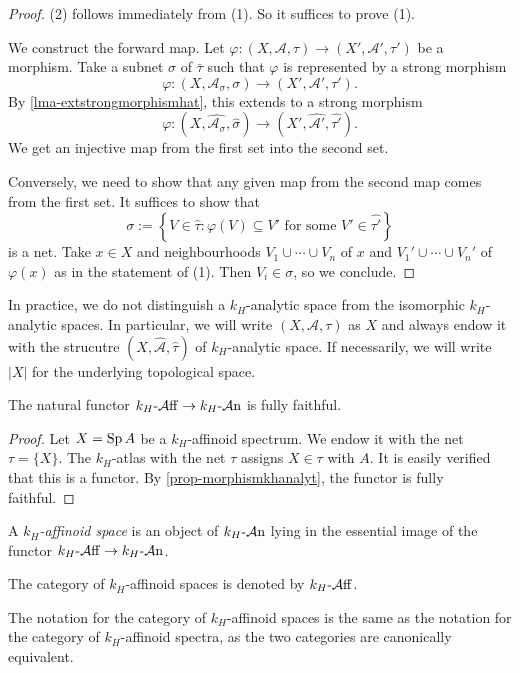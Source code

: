 \begin{proof}
    (2) follows immediately from (1). So it suffices to prove (1).

    We construct the forward map. Let $\varphi:(X,\mathcal{A},\tau)\rightarrow (X',\mathcal{A}',\tau')$ be a morphism. Take a subnet $\sigma$ of $\bar{\tau}$ such that $\varphi$ is represented by a strong morphism
    \[
        \varphi:(X,\mathcal{A}_{\sigma},\sigma)\rightarrow (X',\mathcal{A}',\tau').
    \]  
    By \cref{lma-extstrongmorphismhat}, this extends to a strong morphism
    \[
        \varphi:(X,\widehat{\mathcal{A}_{\sigma}},\hat{\sigma})\rightarrow (X',\widehat{\mathcal{A}'},\widehat{\tau'}).
    \] 
    We get an injective map from the first set into the second set.

    Conversely, we need to show that any given map from the second map comes from the first set. It suffices to show that
    \[
        \sigma:=\left\{ V\in \hat{\tau} : \varphi(V)\subseteq V'\text{ for some } V'\in \widehat{\tau'} \right\}
    \]
    is a net. Take $x\in X$ and neighbourhoods $V_1\cup\cdots\cup V_n$ of $x$ and $V_1'\cup\cdots\cup V_n'$ of $\varphi(x)$ as in the statement of (1). Then $V_i\in \sigma$, so we conclude. 
\end{proof}

In practice, we do not distinguish a $k_H$-analytic space from the isomorphic $k_H$-analytic spaces. In particular, we will write $(X,\mathcal{A},\tau)$ as $X$ and always endow it with the strucutre $(X,\hat{\mathcal{A}},\hat{\tau})$ of $k_H$-analytic space. If necessarily, we will write $|X|$ for the underlying topological space.

\begin{corollary}
    The natural functor $k_H\text{-}\mathcal{A}\mathrm{ff}\rightarrow k_H\text{-}\mathcal{A}\mathrm{n}$ is fully faithful.
\end{corollary}
\begin{proof}
    Let $X=\operatorname{Sp} A$ be a $k_H$-affinoid spectrum. We endow it with the net $\tau= \{X\}$. The $k_H$-atlas with the net $\tau$ assigns $X\in \tau$ with $A$. It is easily verified that this is a functor. By \cref{prop-morphismkhanalyt}, the functor is fully faithful.
\end{proof}

\begin{definition}
    A \emph{$k_H$-affinoid space} is an object of $k_H\text{-}\mathcal{A}\mathrm{n}$ lying in the essential image of the functor $k_H\text{-}\mathcal{A}\mathrm{ff}\rightarrow k_H\text{-}\mathcal{A}\mathrm{n}$.

    The category of $k_H$-affinoid spaces is denoted by $k_H\text{-}\mathcal{A}\mathrm{ff}$.
\end{definition}
The notation for the category of $k_H$-affinoid spaces is the same as the notation for the category of $k_H$-affinoid spectra, as the two categories are canonically equivalent.

